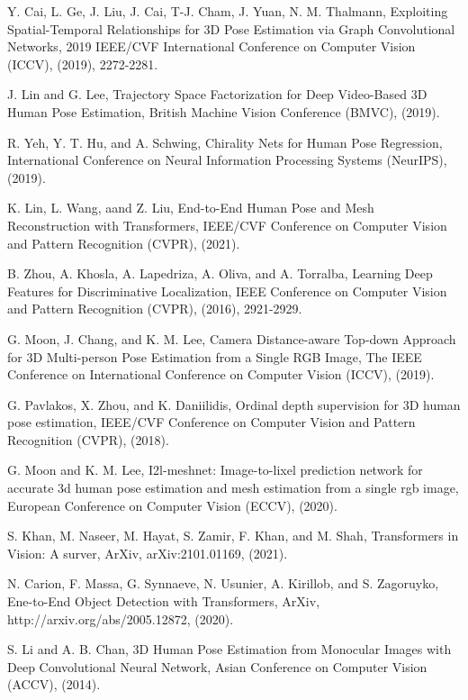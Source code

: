 \documentclass{article}
\begin{document}
\begin{thebibliography}{9}
 Y. Cai, L. Ge, J. Liu, J. Cai, T-J. Cham, J. Yuan, N. M. Thalmann, Exploiting Spatial-Temporal Relationships for 3D Pose Estimation via Graph Convolutional Networks, 2019 IEEE/CVF International Conference on Computer Vision (ICCV), (2019), 2272-2281.

 J. Lin and G. Lee, Trajectory Space Factorization for Deep Video-Based 3D Human Pose Estimation, British Machine Vision Conference (BMVC), (2019).

 R. Yeh, Y. T. Hu, and A. Schwing, Chirality Nets for Human Pose Regression, International Conference on Neural Information Processing Systems (NeurIPS), (2019).

 K. Lin, L. Wang, aand Z. Liu, End-to-End Human Pose and Mesh Reconstruction with Transformers, IEEE/CVF Conference on Computer Vision and Pattern Recognition (CVPR), (2021).

 B. Zhou, A. Khosla, A. Lapedriza, A. Oliva, and A. Torralba, Learning Deep Features for Discriminative Localization, IEEE Conference on Computer Vision and Pattern Recognition (CVPR), (2016), 2921-2929.


 G. Moon, J. Chang, and K. M. Lee, Camera Distance-aware Top-down Approach for 3D Multi-person Pose Estimation from a Single RGB Image, The IEEE Conference on International Conference on Computer Vision (ICCV), (2019).

 G. Pavlakos, X. Zhou, and K. Daniilidis, Ordinal depth supervision for 3D human pose estimation, IEEE/CVF Conference on Computer Vision and Pattern Recognition (CVPR), (2018).

 G. Moon and K. M. Lee, I2l-meshnet: Image-to-lixel prediction network for accurate 3d human pose estimation and mesh estimation from a single rgb image, European Conference on Computer Vision (ECCV), (2020).

 S. Khan, M. Naseer, M. Hayat, S. Zamir, F. Khan, and M. Shah, Transformers in Vision: A surver, ArXiv, arXiv:2101.01169, (2021).

 N. Carion, F. Massa, G. Synnaeve, N. Usunier, A. Kirillob, and S. Zagoruyko, Ene-to-End Object Detection with Transformers, ArXiv, http://arxiv.org/abs/2005.12872, (2020).

 S. Li and A. B. Chan, 3D Human Pose Estimation from Monocular Images with Deep Convolutional Neural Network, Asian Conference on Computer Vision (ACCV), (2014). 


\end{thebibliography}
\end{document}
